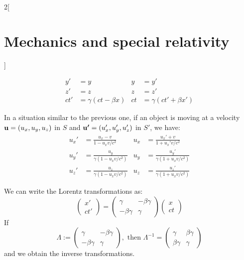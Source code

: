 \documentclass[../../../main.tex]{subfiles}
\begin{document}
\begin{multicols}{2}[\section{Mechanics and special relativity}]
\begin{prop}
\begin{align*}
      y'  & =y                  & y  & =y'                   \\
      z'  & =z                  & z  & =z'                   \\
      ct' & =\gamma(ct-\beta x) & ct & =\gamma(ct'+\beta x')
    \end{align*}
  \end{prop}
  \begin{prop}
    In a situation similar to the previous one, if an object is moving at a velocity $\boldsymbol{\mathrm{u}}=(u_x,u_y,u_z)$ in $S$ and $\boldsymbol{\mathrm{u'}}=(u_x',u_y',u_z')$ in $S'$, we have:
    \begin{align*}
      u_x' & =\frac{u_x-v}{1-u_xv/c^2}                   & u_x & =\frac{u_x'+v}{1+u_x'v/c^2}                  \\
      u_y' & =\frac{u_y}{\gamma \left(1-u_xv/c^2\right)} & u_y & =\frac{u_y'}{\gamma \left(1+u_xv/c^2\right)} \\
      u_z' & =\frac{u_z}{\gamma \left(1-u_xv/c^2\right)} & u_z & =\frac{u_z'}{\gamma \left(1+u_xv/c^2\right)}
    \end{align*}
  \end{prop}
  \begin{prop}
    We can write the Lorentz transformations as:
    $$\begin{pmatrix}
        x' \\
        ct'
      \end{pmatrix}=\begin{pmatrix}
        \gamma       & -\beta\gamma \\
        -\beta\gamma & \gamma
      \end{pmatrix}\begin{pmatrix}
        x \\
        ct
      \end{pmatrix}$$ If $$\Lambda:=\begin{pmatrix}
        \gamma       & -\beta\gamma \\
        -\beta\gamma & \gamma
      \end{pmatrix},\text{ then }\Lambda^{-1}=\begin{pmatrix}
        \gamma      & \beta\gamma \\
        \beta\gamma & \gamma
      \end{pmatrix}$$ and we obtain the inverse transformations.
  \end{prop}
  \begin{prop}

\end{prop}
\end{multicols}
\end{document}
